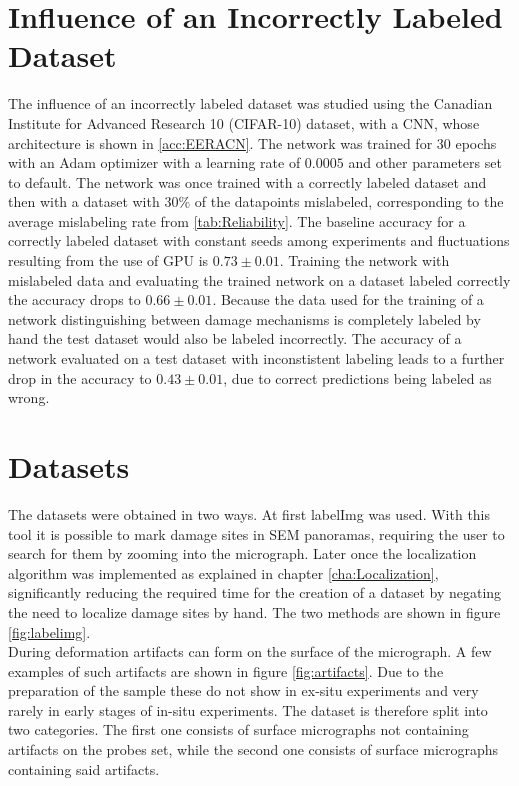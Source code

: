 \section{Influence of an Incorrectly Labeled Dataset}

The influence of an incorrectly labeled dataset was studied using the Canadian Institute for Advanced Research 10 (CIFAR-10) \cite{Krizhevsky2009} dataset, with a CNN, whose architecture is shown in \ref{acc:EERACN}. The network was trained for $30$ epochs with an Adam optimizer \cite{Sharma2017} with a learning rate of $0.0005$ and other parameters set to default. The network was once trained with a correctly labeled dataset and then with a dataset with $30\%$ of the datapoints mislabeled, corresponding to the average mislabeling rate from \ref{tab:Reliability}. The baseline accuracy for a correctly labeled dataset with constant seeds among experiments and fluctuations resulting from the use of GPU is $0.73\pm 0.01$. Training the network with mislabeled data and evaluating the trained network on a dataset labeled correctly the accuracy drops to $0.66\pm 0.01$. Because the data used for the training of a network distinguishing between damage mechanisms is completely labeled by hand the test dataset would also be labeled incorrectly. The accuracy of a network evaluated on a test dataset with inconstistent labeling leads to a further drop in the accuracy to $0.43\pm 0.01$, due to correct predictions being labeled as wrong.\\


\section{Datasets}
The datasets were obtained in two ways. At first labelImg \cite{labelImg} was used. With this tool it is possible to mark damage sites in SEM panoramas, requiring the user to search for them by zooming into the micrograph. Later once the localization algorithm was implemented as explained in chapter \ref{cha:Localization}, significantly reducing the required time for the creation of a dataset by negating the need to localize damage sites by hand. The two methods are shown in figure \ref{fig:labelimg}. \\

During deformation artifacts can form on the surface of the micrograph. A few examples of such artifacts are shown in figure \ref{fig:artifacts}. Due to the preparation of the sample these do not show in ex-situ experiments and very rarely in early stages of in-situ experiments. The dataset is therefore split into two categories. The first one consists of surface micrographs not containing artifacts on the probes set, while the second one consists of surface micrographs containing said artifacts. \\

